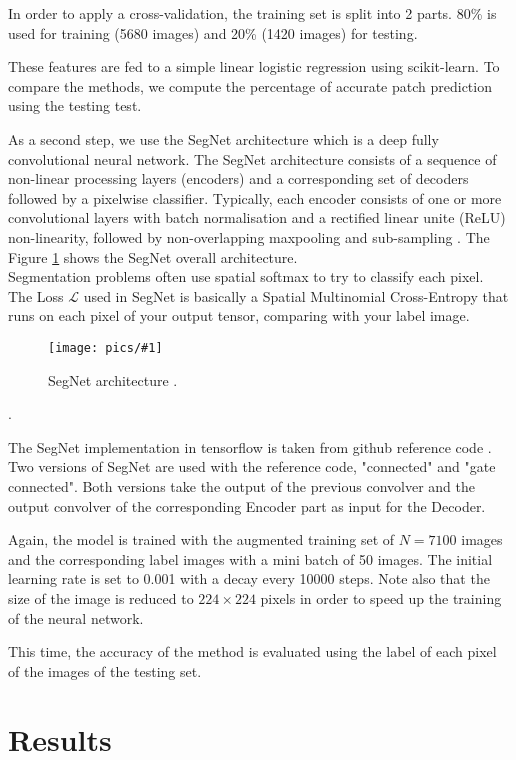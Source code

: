 \documentclass[10pt,conference,compsocconf]{IEEEtran}
\newcommand{\scalefig}[4]{
  \begin{figure}[ht!]
    \centering
    \texttt{[image: pics/\#1]}
 \caption{#3}
    \label{#4}
  \end{figure}}
\newcommand{\Lagr}{\mathcal{L}}
\begin{document}
In order to apply a cross-validation, the training set is split into 2 parts. 80\%  is used for training (5680 images) and 20\% (1420 images) for testing. 

These features are fed to a simple linear logistic regression using scikit-learn. To compare the methods, we compute the percentage of accurate patch prediction using the testing test.

As a second step, we use the SegNet architecture which is a deep fully convolutional neural network. The SegNet architecture consists of a sequence of non-linear processing layers (encoders) and a corresponding set of decoders followed by a pixelwise classifier. Typically, each encoder consists of one or more convolutional layers with batch normalisation and a rectified linear unite (ReLU) non-linearity, followed by non-overlapping maxpooling and sub-sampling  \cite{segnet2}. The Figure \ref{fig:segnet_arch} shows the SegNet overall architecture.\\
Segmentation problems often use spatial softmax to try to classify each pixel. The Loss $\Lagr$ used in SegNet is basically a Spatial Multinomial Cross-Entropy that runs on each pixel of your output tensor, comparing with your label image.

\scalefig{segnet}{1}{SegNet architecture \cite{segnet2}.}{fig:segnet_arch}.

The SegNet implementation in tensorflow is taken from github reference code \cite{leo}. Two versions of SegNet are used with the reference code, "connected" and "gate connected". Both versions take the output of the previous convolver and the output convolver of the corresponding Encoder part as input for the Decoder. 
 
Again, the model is trained with the augmented training set of $N=7100$ images and the corresponding label images with a mini batch of 50 images. The initial learning rate is set to 0.001 with a decay every 10000 steps. Note also that the size of the image is reduced to $224 \times 224$ pixels in order to speed up the training of the neural network.

This time, the accuracy of the method is evaluated using the label of each pixel of the images of the testing set.

\section{Results}
\end{document}
